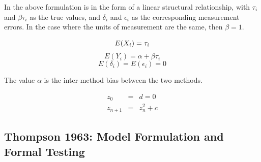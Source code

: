 \documentclass[12pt, a4paper]{report}
\theoremstyle{plain}
\theoremstyle{definition}
\theoremstyle{remark}
\begin{document}
In the above formulation is in the form of a linear structural
relationship, with $\tau_{i}$ and $\beta\tau_{i}$ as the true
values, and $\delta_{i}$ and $\epsilon_{i}$ as the corresponding
measurement errors. In the case where the units of measurement are
the same, then $\beta =1$.

\begin{equation}
E(X_{i}) = \tau_{i}\\
\end{equation}
\begin{equation}
E(Y_{i}) = \alpha +\beta\tau_{i} \nonumber
\end{equation}
\begin{equation}
E(\delta_{i}) = E(\epsilon_{i}) = 0 \nonumber
\end{equation}

The value $\alpha$ is the inter-method bias between the two
methods.

\begin{eqnarray}
z_0 &=& d = 0 \\
z_{n+1} &=& z_n^2+c
\end{eqnarray}

	\subsection{Thompson 1963: Model Formulation and Formal Testing}
	
	
	
\end{document}
